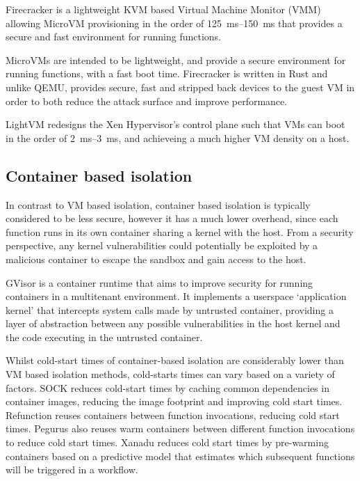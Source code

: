 Firecracker \cite{agacheFirecrackerLightweightVirtualization2020} is a lightweight KVM\cite{KVM} based Virtual Machine Monitor (VMM) allowing MicroVM provisioning in the order of \qtyrange{125}{150}{\ms} that provides a secure and fast environment for running \faas{} functions.

MicroVMs are intended to be lightweight, and provide a secure environment for running functions, with a fast boot time. Firecracker is written in Rust and unlike QEMU, provides secure, fast and stripped back devices to the guest VM in order to both reduce the attack surface and improve performance\cite{jainStudyFirecrackerMicroVM2020}.

LightVM redesigns the Xen Hypervisor's control plane such that VMs can boot in the order of \qtyrange{2}{3}{\ms}\cite{mancoMyVMLighter2017}, and achieveing a much higher VM density on a host.

\subsection{Container based isolation}
In contrast to VM based isolation, container based isolation is typically considered to be less secure\cite{DemystifyingContainerVs}, however it has a much lower overhead, since each function runs in its own container sharing a kernel with the host\cite{WhatContainerDocker}. From a security perspective, any kernel vulnerabilities could potentially be exploited by a malicious container to escape the sandbox and gain access to the host\cite{linMeasurementStudyLinux2018}.

GVisor is a container runtime that aims to improve security for running containers in a multitenant environment\cite{GVisor}. It implements a userspace `application kernel' that intercepts system calls made by untrusted container, providing a layer of abstraction between any possible vulnerabilities in the host kernel and the code executing in the untrusted container.

Whilst cold-start times of container-based \faas{} isolation are considerably lower than VM based isolation methods, cold-starts times can vary based on a variety of factors. SOCK reduces cold-start times by caching common dependencies in container images, reducing the image footprint and improving cold start times\cite{oakesSOCKRapidTask2018}. Refunction reuses containers between function invocations, reducing cold start times\cite{oliverstenbomRefunctionEliminatingServerless2019}. Pegurus also reuses warm containers between different function invocations to reduce cold start times\cite{liPagurusEliminatingCold2021}. Xanadu reduces cold start times by pre-warming containers based on a predictive model that estimates which subsequent functions will be triggered in a \faas{} workflow\cite{dawXanaduMitigatingCascading2020}.

